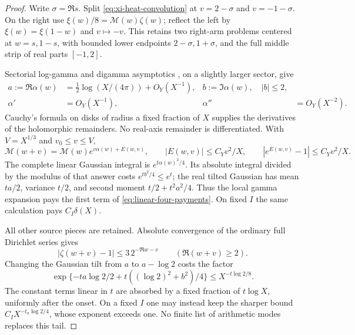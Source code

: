 \begin{proof}
Write $\sigma=\Re s$. Split \eqref{eq:xi-heat-convolution} at
$v=2-\sigma$ and $v=-1-\sigma$.  On the right use
$\xi(w)/8=\mathcal M(w)\zeta(w)$; reflect the left by
$\xi(w)=\xi(1-w)$ and $v\mapsto-v$.  This retains two right-arm
problems centered at $w=s,1-s$, with bounded lower endpoints
$2-\sigma,1+\sigma$, and the full middle strip of real parts $[-1,2]$.

Sectorial log-gamma and digamma asymptotics
\cite[5.11.1, 5.11.2, 5.11.9 and 5.11(ii)]{DLMFGammaOuter2026},
on a slightly larger sector, give
\begin{equation}
 \begin{aligned}
 a:=\Re\alpha(w)&=\tfrac12\log(X/(4\pi))+O_Y(X^{-1}),
 &b:=\Im\alpha(w),\quad |b|\le2,\\
 \alpha'&=O_Y(X^{-1}),&\alpha''&=O_Y(X^{-2}).
 \end{aligned}
 \label{eq:linear-sector-bounds}
\end{equation}
Cauchy's formula on disks of radius a fixed fraction of $X$ supplies
the derivatives of the holomorphic remainders.  No real-axis remainder
is differentiated.  With $V=X^{1/3}$ and $v_0\le v\le V$,
\[
 \mathcal M(w+v)=\mathcal M(w)e^{v\alpha(w)+E(w,v)},\qquad
 |E(w,v)|\le C_Yv^2/X,\qquad |e^{E(w,v)}-1|\le C_Yv^2/X.
\]
The complete linear Gaussian integral is $e^{t\alpha(w)^2/4}$.
Its absolute integral divided by the modulus of that answer costs
$e^{tb^2/4}\le e^t$; the real tilted Gaussian has mean $ta/2$,
variance $t/2$, and second moment $t/2+t^2a^2/4$.
Thus the local gamma expansion pays the first term of
\eqref{eq:linear-four-payments}.  On fixed $I$ the same calculation
pays $C_I\delta(X)$.

All other source pieces are retained.  Absolute convergence of the
ordinary full Dirichlet series \cite[25.2.1]{DLMFZetaOuter2026} gives
\[
 |\zeta(w+v)-1|\le3\,2^{-\Re w-v}\qquad(\Re(w+v)\ge2).
\]
Changing the Gaussian tilt from $a$ to $a-\log2$ costs the factor
\begin{equation}
 \exp\{-ta\log2/2+t((\log2)^2+b^2)/4\}
 \le X^{-t\log2/8}.
 \label{eq:linear-arithmetic-payment}
\end{equation}
The constant terms linear in $t$ are absorbed by a fixed fraction of
$t\log X$, uniformly after the onset.  On a fixed $I$ one may instead
keep the sharper bound $C_I X^{-t_a\log2/4}$, whose exponent exceeds
one.  No finite list of arithmetic modes replaces this tail.


\end{proof}
